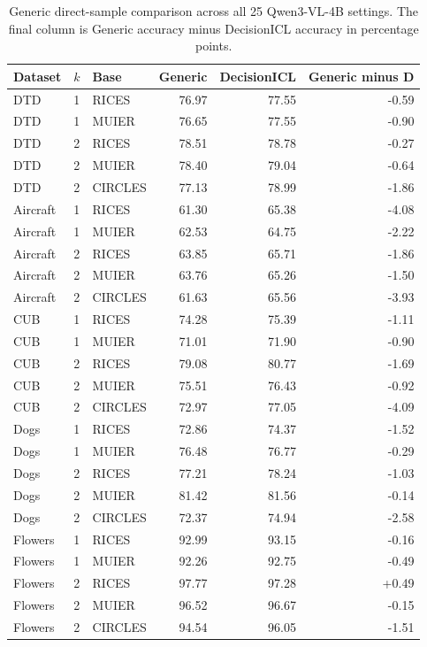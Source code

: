 \documentclass[10pt,twocolumn,letterpaper]{article}
\newcommand{\method}{DecisionICL\xspace}
\begin{document}
\begin{table}[t]
\caption{Generic direct-sample comparison across all 25 Qwen3-VL-4B settings. The final column is Generic accuracy minus \method accuracy in percentage points.}
\label{sup:generic_direct}
\centering\small
\begin{tabular}{lllrrr}
\toprule
Dataset & $k$ & Base & Generic & DecisionICL & Generic minus D \\
\midrule
DTD & 1 & RICES & 76.97 & 77.55 & -0.59 \\
DTD & 1 & MUIER & 76.65 & 77.55 & -0.90 \\
DTD & 2 & RICES & 78.51 & 78.78 & -0.27 \\
DTD & 2 & MUIER & 78.40 & 79.04 & -0.64 \\
DTD & 2 & CIRCLES & 77.13 & 78.99 & -1.86 \\
Aircraft & 1 & RICES & 61.30 & 65.38 & -4.08 \\
Aircraft & 1 & MUIER & 62.53 & 64.75 & -2.22 \\
Aircraft & 2 & RICES & 63.85 & 65.71 & -1.86 \\
Aircraft & 2 & MUIER & 63.76 & 65.26 & -1.50 \\
Aircraft & 2 & CIRCLES & 61.63 & 65.56 & -3.93 \\
CUB & 1 & RICES & 74.28 & 75.39 & -1.11 \\
CUB & 1 & MUIER & 71.01 & 71.90 & -0.90 \\
CUB & 2 & RICES & 79.08 & 80.77 & -1.69 \\
CUB & 2 & MUIER & 75.51 & 76.43 & -0.92 \\
CUB & 2 & CIRCLES & 72.97 & 77.05 & -4.09 \\
Dogs & 1 & RICES & 72.86 & 74.37 & -1.52 \\
Dogs & 1 & MUIER & 76.48 & 76.77 & -0.29 \\
Dogs & 2 & RICES & 77.21 & 78.24 & -1.03 \\
Dogs & 2 & MUIER & 81.42 & 81.56 & -0.14 \\
Dogs & 2 & CIRCLES & 72.37 & 74.94 & -2.58 \\
Flowers & 1 & RICES & 92.99 & 93.15 & -0.16 \\
Flowers & 1 & MUIER & 92.26 & 92.75 & -0.49 \\
Flowers & 2 & RICES & 97.77 & 97.28 & +0.49 \\
Flowers & 2 & MUIER & 96.52 & 96.67 & -0.15 \\
Flowers & 2 & CIRCLES & 94.54 & 96.05 & -1.51 \\
\bottomrule
\end{tabular}
\end{table}
\end{document}
